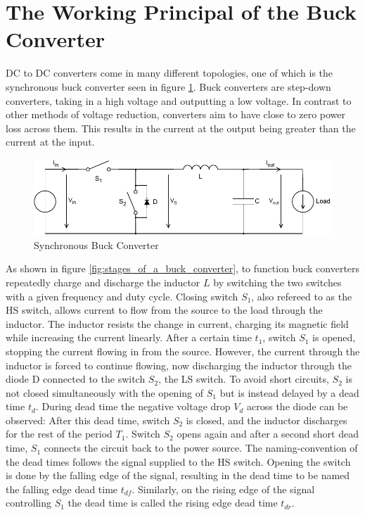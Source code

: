 \section{The Working Principal of the Buck Converter}
\label{sec:the_working_principal_of_the_buck_converter}
DC to DC converters come in many different topologies, one of which is the synchronous buck converter seen in figure \ref{fig:synch_buck_converter_2}. Buck converters are step-down converters, taking in a high voltage and outputting a low voltage. In contrast to other methods of voltage reduction, converters aim to have close to zero power loss across them. This results in the current at the output being greater than the current at the input. \\
\begin{figure}[H]
    \centering
    \includegraphics[width=1\linewidth]{Bilder//Kapitel2/SBC_2_D.pdf}
    \caption{Synchronous Buck Converter}
    \label{fig:synch_buck_converter_2}
\end{figure}
As shown in figure \ref{fig:stages_of_a_buck_converter}, to function buck converters repeatedly charge and discharge the inductor $L$ by switching the two switches with a given frequency and duty cycle. Closing switch $S_1$, also refereed to as the \ac{HS} switch, allows current to flow from the source to the load through the inductor. The inductor resists the change in current, charging its magnetic field while increasing the current linearly. After a certain time $t_1$, switch $S_1$ is opened, stopping the current flowing in from the source. However, the current through the inductor is forced to continue flowing, now discharging the inductor through the diode D connected to the switch $S_2$, the \ac{LS} switch. To avoid short circuits, $S_2$ is not closed simultaneously with the opening of $S_1$ but is instead delayed by a dead time $t_{d}$. During dead time the negative voltage drop $V_d$ across the diode can be observed: After this dead time, switch $S_2$ is closed, and the inductor discharges for the rest of the period $T_1$. Switch $S_2$ opens again and after a second short dead time, $S_1$ connects the circuit back to the power source. The naming-convention of the dead times follows the signal supplied to the \ac{HS} switch. Opening the switch is done by the falling edge of the signal, resulting in the dead time to be named the falling edge dead time $t_{df}$. Similarly, on the rising edge of the signal controlling $S_1$ the dead time is called the rising edge dead time $t_{dr}$.

